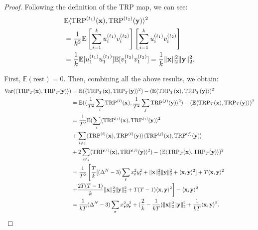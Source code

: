 \begin{proof}
Following the definition of the TRP map, we can see:
\begin{equation}
\begin{aligned}
&\mathbb{E} \langle \textup{TRP}^{(t_1)}(\mathbf{x}), \textup{TRP}^{(t_2)}(\mathbf{y}) \rangle^2\\ 
&=\frac{1}{k^2} \mathbb{E} \left[ \sum_{i=1}^k u^{(t_1)}_i v^{(t_2)}_i \right]\left[ \sum_{i=1}^k u^{(t_1)}_i v^{(t_2)}_i \right] \\
&= \frac{1}{k}  \mathbb{E} [u^{(t_1)}_1 u^{(t_1)}_1]\mathbb{E} [v^{(t_2)}_1 v^{(t_2)}_1] = \frac{1}{k}\|\mathbf{x}\|_2^2\|\mathbf{y}\|_2^2. \nonumber
\end{aligned}
\end{equation}


First, $\mathbb{E}(\text{rest}) = 0$. Then, combining all the above results, we obtain:
\begin{equation*}
\begin{aligned}
\mbox{Var}(\langle \textup{TRP}_T(\mathbf{x}), \textup{TRP}_T(\mathbf{y}) \rangle) &= 
\mathbb{E}(\langle \textup{TRP}_T(\mathbf{x}), \textup{TRP}_T(\mathbf{y}) \rangle^2) - (\mathbb{E}\langle \textup{TRP}_T(\mathbf{x}), \textup{TRP}_T(\mathbf{y}) \rangle)^2 \\   
&= 
\mathbb{E}(\langle \frac{1}{T^2}\sum_{i} \textup{TRP}^{(i)}(\mathbf{x}), \frac{1}{T^2} \sum_{j} \textup{TRP}^{(j)}(\mathbf{y}) \rangle^2) - (\mathbb{E}\langle \textup{TRP}_T(\mathbf{x}), \textup{TRP}_T(\mathbf{y}) \rangle)^2 \\  
&= \frac{1}{T^2}\mathbb{E}(\sum_{i} \langle \textup{TRP}^{(i)}(\mathbf{x}), \textup{TRP}^{(i)}(\mathbf{y}) \rangle^2 \\
&+ \sum_{i \neq j} \langle \textup{TRP}^{(i)}(\mathbf{x}), \textup{TRP}^{(i)}(\mathbf{y}) \rangle \langle \textup{TRP}^{(j)}(\mathbf{x}), \textup{TRP}^{(j)}(\mathbf{y}) \rangle \\
&+2 \sum_{i \neq j} \langle \textup{TRP}^{(i)}(\mathbf{x}), \textup{TRP}^{(j)}(\mathbf{y}) \rangle^2 ) - (\mathbb{E}\langle \textup{TRP}_T(\mathbf{x}), \textup{TRP}_T(\mathbf{y}) \rangle)^2 \\   
&=  \frac{1}{T^2}\left[ \frac{T}{k} [ (\Delta^N - 3) \sum_{\mathbf{r}}x_{\mathbf{r}}^2y_{\mathbf{r}}^2  + \|\mathbf{x}\|_2^2\|\mathbf{y}\|^2_2 + \langle \mathbf{x}, \mathbf{y} \rangle^2 ] + T\langle \mathbf{x}, \mathbf{y} \rangle^2 \right.\\
&\left. +  \frac{2T(T-1)}{k} \|\mathbf{x}\|_2^2\|\mathbf{y}\|_2^2 + T(T-1)\langle \mathbf{x}, \mathbf{y}\rangle^2 \right] - \langle \mathbf{x}, \mathbf{y} \rangle^2 \\  
&= \frac{1}{kT}(\Delta^N -3) \sum_{\mathbf{r}}x_{\mathbf{r}}^2y_{\mathbf{r}}^2 +  (\frac{2}{k} - \frac{1}{kT})\|\mathbf{x}\|_2^2\|\mathbf{y}\|_2^2 + \frac{1}{kT}\langle \mathbf{x}, \mathbf{y} \rangle^2.  \\
\end{aligned}  
\end{equation*}

\end{proof}
\clearpage

